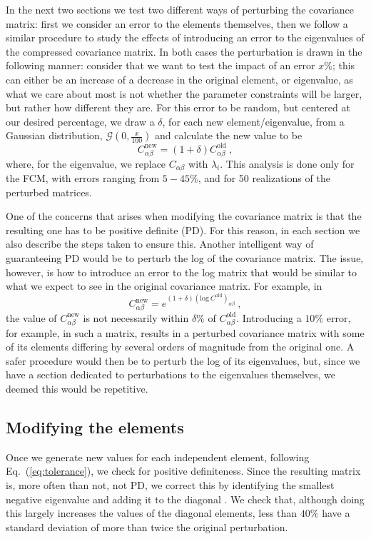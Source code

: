 \documentclass[aps, prd, twocolumn, superscriptaddress, nofootinbib, amssymb, amsmath]{revtex4-2}
\newcommand{\ec}[1]{Eq.~(\ref{eq:#1})}
\newcommand\be{\begin{equation}}
\newcommand\ee{\end{equation}}
\newcommand\full{the FCM}
\begin{document}
In the next two sections we test two different ways of perturbing the covariance matrix: first we consider an error to the elements themselves, then we follow a similar procedure to study the effects of introducing an error to the eigenvalues of the compressed covariance matrix. In both cases the perturbation is drawn in the following manner: consider that we want to test the impact of an error $x \%$; this can either be an increase of a decrease in the original element, or eigenvalue, as what we care about most is not whether the parameter constraints will be larger, but rather how different they are. For this error to be random, but centered at our desired percentage, we draw a $\delta$, for each new element/eigenvalue, from a Gaussian distribution, $\mathcal{G}(0,\frac{x}{100})$ and calculate the new value to be
\be \label{eq:tolerance}
C_{\alpha \beta}^{\text{new}} = (1 + \delta)C_{\alpha \beta}^{\text{old}}\ 
,\ee
where, for the eigenvalue, we replace $C_{\alpha \beta}$ with $\lambda_i$. This analysis is done only for \full, with errors ranging from $5 - 45 \%$, and for 50 realizations of the perturbed matrices.


One of the concerns that arises when modifying the covariance matrix is that the resulting one has to be positive definite (PD). For this reason, in each section we also describe the steps taken to ensure this. Another intelligent way of guaranteeing PD would be to perturb the log of the covariance matrix. The issue, however, is how to introduce an error to the log matrix that would be similar to what we expect to see in the original covariance matrix. For example, in
	\be
	C_{\alpha \beta}^{\text{new}} = e^{(1 + \delta)(\text{log}\ C^{\text{old}})_{\alpha \beta}}\ 
	,\ee
	the value of $C_{\alpha \beta}^{\text{new}}$ is not necessarily within $\delta \%$ of $C_{\alpha \beta}^{\text{old}}$. Introducing a $10\%$ error, for example, in such a matrix, results in a perturbed covariance matrix with some of its elements differing by several orders of magnitude from the original one. A safer procedure would then be to perturb the log of its eigenvalues, but, since we have a section dedicated to perturbations to the eigenvalues themselves, we deemed this would be repetitive.

\subsection{Modifying the elements}

Once we generate new values for each independent element, following \ec{tolerance}, we check for positive definiteness. Since the resulting matrix is, more often than not, not PD, we correct this by identifying the smallest negative eigenvalue and adding it to the diagonal \cite{Yuan:2008}. We check that, although doing this largely increases the values of the diagonal elements, less than $40 \%$ have a standard deviation of more than twice the original perturbation. 
\end{document}
